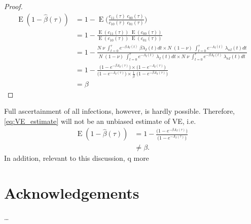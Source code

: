 \documentclass{article}[11pt]
\DeclareMathOperator{\E}{E}
\begin{document}
\begin{proof}
	\begin{align}
\E(1- \hat{\beta}(\tau)) &= 1 - \E\big(\frac{c_{11}(\tau) \; c_{00}(\tau)}{c_{10}(\tau)\; c_{01}(\tau)}\big)\\
  &= 1 - \frac{\E(c_{11}(\tau)) \; \E(c_{00}(\tau))}{\E(c_{10}(\tau))\; \E(c_{01}(\tau))} \\
  &= 1 - \frac{N \; \nu \; \int_{t=0}^{\tau} e^{-\beta \Lambda_I(t)} \; \beta \lambda_I(t) dt \times 
  	N \; (1 - \nu) \; \int_{t=0}^{\tau} e^{-\Lambda_I(t)}\; \lambda_{nI}(t) dt}{
  		N \; (1 - \nu) \; \int_{t=0}^{\tau} e^{-\Lambda_I(t)}\; \lambda_I(t) dt \times
  		N \; \nu \; \int_{t=0}^{\tau} e^{-\beta \Lambda_I(t)}\;\lambda_{nI}(t) dt} \\
  	&= 1 - \frac{\big(1 - e^{ - \beta \Lambda_I(\tau)}\big)\times \big(1 - e^{ - \Lambda_I(\tau)}\big)}{\big(1 - e^{ - \Lambda_I(\tau)}\big)\times \frac{1}{\beta} \; \big(1 - e^{ - \beta \Lambda_I(\tau)}\big) }\\
  			&= \beta 
\end{align}
%
\end{proof}
%
Full ascertainment of all infections, however, is hardly possible. Therefore, \eqref{eq:VE_estimate} will not be an unbiased estimate of VE, i.e.
%
\begin{align}
\E (1 - \hat{\beta}(\tau)) & = 1 - \frac{\big(1 - e^{ - \beta \Lambda_I(\tau)}\big)}{\big(1 - e^{ - \Lambda_I(\tau)}\big)} \\
 &\neq \beta.
\end{align}
%
In addition, relevant to this discussion, q
 more
%
\section*{Acknowledgements}
\ldots
\clearpage
%
\printbibliography
%
%
%
\end{document}
